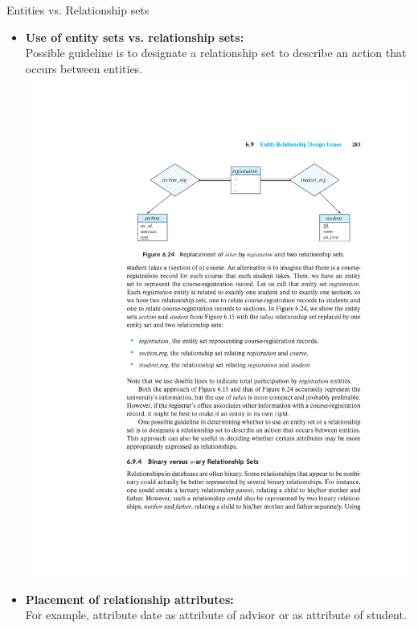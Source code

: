 \documentclass{beamer}
\begin{document}
\begin{frame}{Entities vs. Relationship sets}
    \begin{itemize}
        \item \textbf{Use of entity sets vs. relationship sets:}\\
        Possible guideline is to designate a relationship set to describe an action that occurs between entities.
        \includegraphics[trim={5cm 18.5cm 0cm 4cm}, clip, width=\textwidth]{figures/registration}
        \item \textbf{Placement of relationship attributes:}\\
        For example, attribute date as attribute of advisor or as attribute of student.
    \end{itemize}
\end{frame}
\end{document}
